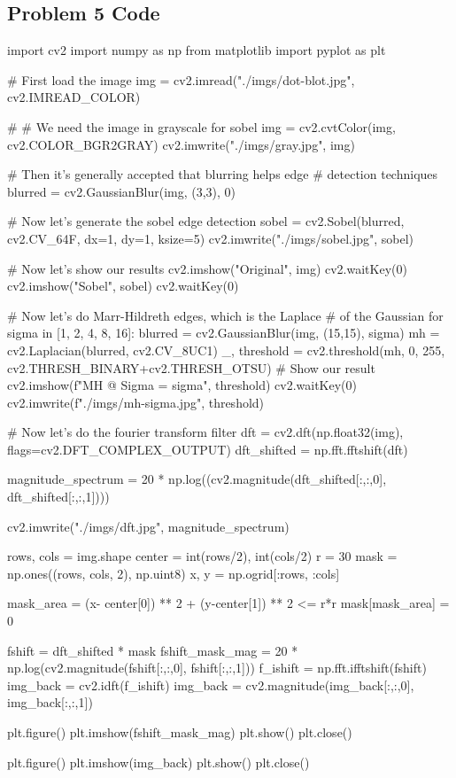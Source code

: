 \documentclass{article}
\begin{document}
\subsection*{Problem 5 Code}

\begin{python}
import cv2
import numpy as np
from matplotlib import pyplot as plt

# First load the image
img = cv2.imread("./imgs/dot-blot.jpg", cv2.IMREAD_COLOR)

# # We need the image in grayscale for sobel
img = cv2.cvtColor(img, cv2.COLOR_BGR2GRAY)
cv2.imwrite("./imgs/gray.jpg", img)

# Then it's generally accepted that blurring helps edge
# detection techniques
blurred = cv2.GaussianBlur(img, (3,3), 0)

# Now let's generate the sobel edge detection
sobel = cv2.Sobel(blurred, cv2.CV_64F, dx=1, dy=1, ksize=5)
cv2.imwrite("./imgs/sobel.jpg", sobel)

# Now let's show our results
cv2.imshow("Original", img)
cv2.waitKey(0)
cv2.imshow("Sobel", sobel)
cv2.waitKey(0)

# Now let's do Marr-Hildreth edges, which is the Laplace
# of the Gaussian
for sigma in [1, 2, 4, 8, 16]:
    blurred = cv2.GaussianBlur(img, (15,15), sigma)
    mh = cv2.Laplacian(blurred, cv2.CV_8UC1)
    _, threshold = cv2.threshold(mh, 0, 255, cv2.THRESH_BINARY+cv2.THRESH_OTSU)
    # Show our result
    cv2.imshow(f"MH @ Sigma = {sigma}", threshold)
    cv2.waitKey(0)
    cv2.imwrite(f"./imgs/mh-{sigma}.jpg", threshold)

# Now let's do the fourier transform filter
dft = cv2.dft(np.float32(img), flags=cv2.DFT_COMPLEX_OUTPUT)
dft_shifted = np.fft.fftshift(dft)

magnitude_spectrum = 20 * np.log((cv2.magnitude(dft_shifted[:,:,0], dft_shifted[:,:,1])))

cv2.imwrite("./imgs/dft.jpg", magnitude_spectrum)

rows, cols = img.shape
center = int(rows/2), int(cols/2)
r = 30
mask = np.ones((rows, cols, 2), np.uint8)
x, y = np.ogrid[:rows, :cols]

mask_area = (x- center[0]) ** 2 + (y-center[1]) ** 2 <= r*r
mask[mask_area] = 0

fshift = dft_shifted * mask
fshift_mask_mag = 20 * np.log(cv2.magnitude(fshift[:,:,0], fshift[:,:,1]))
f_ishift = np.fft.ifftshift(fshift)
img_back = cv2.idft(f_ishift)
img_back = cv2.magnitude(img_back[:,:,0], img_back[:,:,1])

plt.figure()
plt.imshow(fshift_mask_mag)
plt.show()
plt.close()

plt.figure()
plt.imshow(img_back)
plt.show()
plt.close()
\end{python}
\end{document}
